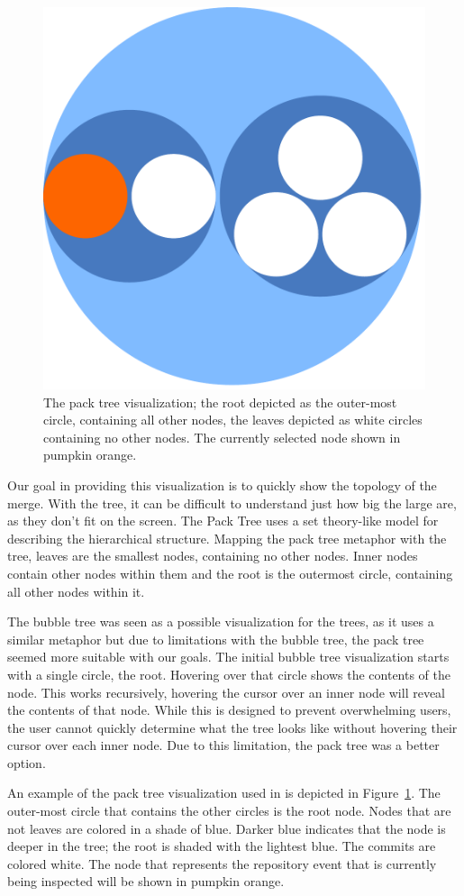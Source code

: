 \begin{figure}[htpb]
  \centering
  \includegraphics[width=0.4\linewidth]{Figures/Linvis/linvis_bubble.pdf}
  \caption{The pack tree visualization; the root depicted as the
    outer-most circle, containing all other nodes, the leaves depicted
    as white circles containing no other nodes. The currently selected
    node shown in pumpkin orange.}
  \label{fig:linvis_bubble_tree}
\end{figure}

Our goal in providing this visualization is to quickly show the topology
of the merge. With the \rt{} tree, it can be difficult to understand
just how big the large \mt{} are, as they don't fit on the screen. The
Pack Tree uses a set theory-like model for describing the hierarchical
structure. Mapping the pack tree metaphor with the tree, leaves are the
smallest nodes, containing no other nodes. Inner nodes contain other
nodes within them and the root is the outermost circle, containing all
other nodes within it.

The bubble tree\cite{Boardman2000} was seen as a possible visualization
for the trees, as it uses a similar metaphor but due to limitations with
the bubble tree, the pack tree seemed more suitable with our goals. The
initial bubble tree visualization starts with a single circle, the root.
Hovering over that circle shows the contents of the node. This works
recursively, hovering the cursor over an inner node will reveal the
contents of that node. While this is designed to prevent overwhelming
users, the user cannot quickly determine what the tree looks like
without hovering their cursor over each inner node. Due to this
limitation, the pack tree was a better option.

An example of the pack tree visualization used in \tool{} is depicted in
Figure~\ref{fig:linvis_bubble_tree}. The outer-most circle that contains
the other circles is the root node. Nodes that are not leaves are
colored in a shade of blue. Darker blue indicates that the node is
deeper in the tree; the root is shaded with the lightest blue. The
commits are colored white. The node that represents the repository event
that is currently being inspected will be shown in pumpkin orange.
